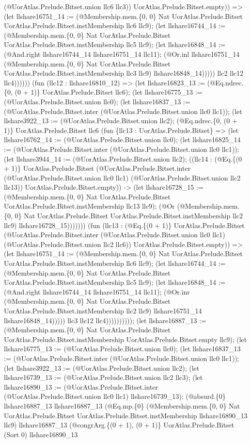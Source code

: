 \documentclass[11pt]{article}
\begin{document}
(@UorAtlas.Prelude.Bitset.union llc6 llc3)) UorAtlas.Prelude.Bitset.empty)) => (let llshare16751\_14 := (@Membership.mem.\{0, 0\} Nat UorAtlas.Prelude.Bitset UorAtlas.Prelude.Bitset.instMembership llc6 llc9); (let llshare16744\_14 := (@Membership.mem.\{0, 0\} Nat UorAtlas.Prelude.Bitset UorAtlas.Prelude.Bitset.instMembership llc5 llc9); (let llshare16848\_14 := (@And.right llshare16744\_14 llshare16751\_14 llc11); (@Or.inl llshare16751\_14 (@Membership.mem.\{0, 0\} Nat UorAtlas.Prelude.Bitset UorAtlas.Prelude.Bitset.instMembership llc3 llc9) llshare16848\_14))))) llc2 llc12 llc4)))))) (fun (llc12 : llshare16810\_12) => (let llshare16823\_13 := (@Eq.ndrec.\{0, (0 + 1)\} UorAtlas.Prelude.Bitset llc6); (let llshare16775\_13 := (@UorAtlas.Prelude.Bitset.union llc0); (let llshare16837\_13 := (@UorAtlas.Prelude.Bitset.inter (@UorAtlas.Prelude.Bitset.union llc0 llc1)); (let llshare3922\_13 := (@UorAtlas.Prelude.Bitset.union llc2); (@Eq.ndrec.\{0, (0 + 1)\} UorAtlas.Prelude.Bitset llc6 (fun \{llc13 : UorAtlas.Prelude.Bitset\} => (let llshare16762\_14 := (@UorAtlas.Prelude.Bitset.union llc0); (let llshare16825\_14 := (@UorAtlas.Prelude.Bitset.inter (@UorAtlas.Prelude.Bitset.union llc0 llc1)); (let llshare3944\_14 := (@UorAtlas.Prelude.Bitset.union llc2); ((llc14 : (@Eq.\{(0 + 1)\} UorAtlas.Prelude.Bitset (@UorAtlas.Prelude.Bitset.inter (@UorAtlas.Prelude.Bitset.union llc0 llc1) (@UorAtlas.Prelude.Bitset.union llc2 llc13)) UorAtlas.Prelude.Bitset.empty)) -> (let llshare16728\_15 := (@Membership.mem.\{0, 0\} Nat UorAtlas.Prelude.Bitset UorAtlas.Prelude.Bitset.instMembership llc13 llc9); (@Or (@Membership.mem.\{0, 0\} Nat UorAtlas.Prelude.Bitset UorAtlas.Prelude.Bitset.instMembership llc2 llc9) llshare16728\_15))))))) (fun (llc13 : (@Eq.\{(0 + 1)\} UorAtlas.Prelude.Bitset (@UorAtlas.Prelude.Bitset.inter (@UorAtlas.Prelude.Bitset.union llc0 llc1) (@UorAtlas.Prelude.Bitset.union llc2 llc6)) UorAtlas.Prelude.Bitset.empty)) => (let llshare16751\_14 := (@Membership.mem.\{0, 0\} Nat UorAtlas.Prelude.Bitset UorAtlas.Prelude.Bitset.instMembership llc6 llc9); (let llshare16744\_14 := (@Membership.mem.\{0, 0\} Nat UorAtlas.Prelude.Bitset UorAtlas.Prelude.Bitset.instMembership llc5 llc9); (let llshare16848\_14 := (@And.right llshare16744\_14 llshare16751\_14 llc11); (@Or.inr (@Membership.mem.\{0, 0\} Nat UorAtlas.Prelude.Bitset UorAtlas.Prelude.Bitset.instMembership llc2 llc9) llshare16751\_14 llshare16848\_14))))) llc3 llc12 llc4)))))))))); (let llshare16887\_13 := (@Membership.mem.\{0, 0\} Nat UorAtlas.Prelude.Bitset UorAtlas.Prelude.Bitset.instMembership UorAtlas.Prelude.Bitset.empty llc9); (let llshare16775\_13 := (@UorAtlas.Prelude.Bitset.union llc0); (let llshare16837\_13 := (@UorAtlas.Prelude.Bitset.inter (@UorAtlas.Prelude.Bitset.union llc0 llc1)); (let llshare3922\_13 := (@UorAtlas.Prelude.Bitset.union llc2); (let llshare16739\_13 := (@UorAtlas.Prelude.Bitset.union llc2 llc3); (let llshare16890\_13 := (@UorAtlas.Prelude.Bitset.inter (@UorAtlas.Prelude.Bitset.union llc0 llc1) llshare16739\_13); (@absurd.\{0\} llshare16887\_13 llshare16887\_13 (@Eq.mp.\{0\} (@Membership.mem.\{0, 0\} Nat UorAtlas.Prelude.Bitset UorAtlas.Prelude.Bitset.instMembership llshare16890\_13 llc9) llshare16887\_13 (@congrArg.\{(0 + 1), (0 + 1)\} UorAtlas.Prelude.Bitset (Sort 0) llshare16890\_13 
\end{document}
